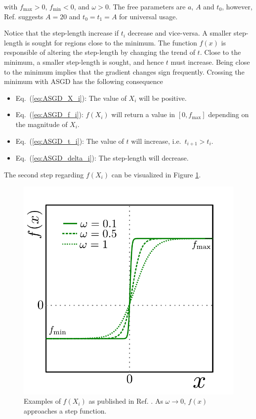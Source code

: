 with $f_\mathrm{max} > 0$, $f_\mathrm{min} < 0$, and $\omega > 0$. The free parameters are $a$, $A$ and $t_0$, however, Ref. \cite{ASGD} suggests $A=20$ and $t_0=t_1=A$ for universal usage.

Notice that the step-length increase if $t_i$ decrease and vice-versa. A smaller step-length is sought for regions close to the minimum. The function $f(x)$ is responsible of altering the step-length by changing the trend of $t$. Close to the minimum, a smaller step-length is sought, and hence $t$ must increase. Being close to the minimum implies that the gradient changes sign frequently. Crossing the minimum with ASGD has the following consequence

\begin{itemize}
 \item Eq.~(\ref{eq:ASGD_X_i}): The value of $X_i$ will be positive.
 \item Eq.~(\ref{eq:ASGD_f_i}): $f(X_i)$ will return a value in $[0, f_\mathrm{max}]$ depending on the magnitude of $X_i$.
 \item Eq.~(\ref{eq:ASGD_t_i}): The value of $t$ will increase, i.e.~$t_{i+1} > t_i$.
 \item Eq.~(\ref{eq:ASGD_delta_i}): The step-length will decrease.
\end{itemize}

The second step regarding $f(X_i)$ can be visualized in Figure \ref{fig:f_ASGD}.

\begin{figure}
 \begin{center}
  \includegraphics[scale=0.75]{../Graphics/ASGD_f.pdf}
  \caption{Examples of $f(X_i)$ as published in Ref. \cite{ASGD}. As $\omega\to0$, $f(x)$ approaches a step function.}
  \label{fig:f_ASGD}
 \end{center}
\end{figure}

